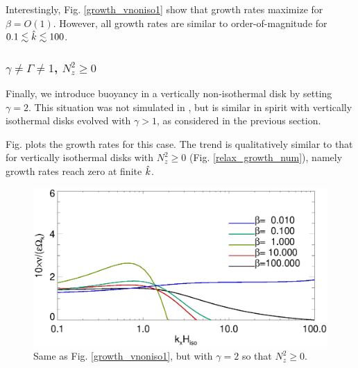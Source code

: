 Interestingly, Fig. \ref{growth_vnoniso1} show that growth rates
maximize for $\beta=O(1)$. However, all growth rates are similar to
order-of-magnitude for $0.1\lesssim\hat{k}\lesssim 100$. 

\subsubsection{$\gamma\neq\Gamma \neq 1$, $N_z^2\geq0$}


Finally, we introduce buoyancy in a vertically non-isothermal disk by
setting $\gamma=2$. This situation was not simulated in 
\cite{nelson13}, but is similar in spirit with vertically isothermal 
disks evolved with $\gamma>1$, as considered in the previous section. 

Fig. plots the growth rates for this case. The trend is
qualitatively similar to that for vertically isothermal disks with
$N_z^2\geq 0$ (Fig. \ref{relax_growth_num}), namely growth rates reach
zero at finite $\hat{k}$. 

\begin{figure}
  \includegraphics[width=\linewidth,clip=true,trim=0cm 0cm 0cm
  0cm]{figures/growth_vnoniso2}
  \caption{Same as Fig. \ref{growth_vnoniso1}, but with $\gamma=2$ so that
    $N_z^2\geq0$. \label{growth_vnoniso2}}
\end{figure} 

 
